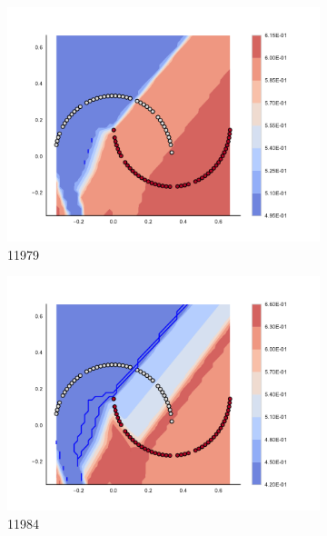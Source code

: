 \begin{figure}[h]
\begin{subfigure}[b]{0.09\textwidth}
    \includegraphics[clip, trim=2.35cm 1.75cm 4.5cm 0cm,width=\textwidth]{img/convergence/11979.pdf}
    \caption{11979}
    \label{fig:convergence_11979}
\end{subfigure}
%
\begin{subfigure}[b]{0.09\textwidth}
    \includegraphics[clip, trim=2.35cm 1.75cm 4.5cm 0cm,width=\textwidth]{img/convergence/11984.pdf}
    \caption{11984}
    \label{fig:convergence_11984}
\end{subfigure}
%
\begin{subfigure}[b]{0.09\textwidth}

\end{subfigure}
\end{figure}
